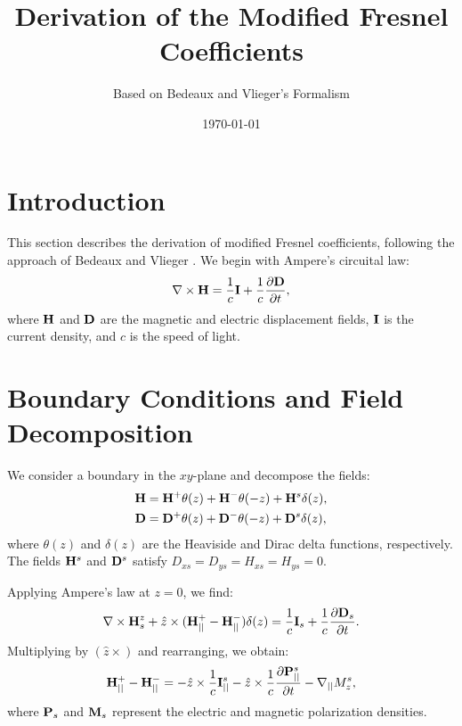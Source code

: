 \documentclass{article}
\begin{document}
	
	\title{Derivation of the Modified Fresnel Coefficients}
	\author{Based on Bedeaux and Vlieger's Formalism}
	\date{\today}
	\maketitle
	
	\section{Introduction}
	This section describes the derivation of modified Fresnel coefficients, following the approach of Bedeaux and Vlieger \cite{bedeaux2001optical}. We begin with Ampere's circuital law:
	\begin{equation}
		\nabla \times \vb{H} = \frac{1}{c} \vb{I} + \frac{1}{c} \frac{\partial \vb{D}}{\partial t},
	\end{equation}
	where $\vb{H}$ and $\vb{D}$ are the magnetic and electric displacement fields, $\vb{I}$ is the current density, and $c$ is the speed of light.
	
	\section{Boundary Conditions and Field Decomposition}
	We consider a boundary in the $xy$-plane and decompose the fields:
	\begin{align}
		\vb{H} &= \vb{H}^{+} \theta(z) + \vb{H}^{-} \theta(-z) + \vb{H}^{s} \delta(z), \\
		\vb{D} &= \vb{D}^{+} \theta(z) + \vb{D}^{-} \theta(-z) + \vb{D}^{s} \delta(z),
	\end{align}
	where $\theta(z)$ and $\delta(z)$ are the Heaviside and Dirac delta functions, respectively. The fields $\vb{H}^s$ and $\vb{D}^s$ satisfy $D_{xs} = D_{ys} = H_{xs} = H_{ys} = 0$.
	
	Applying Ampere’s law at $z=0$, we find:
	\begin{equation}
		\nabla \times \vb{H}_s^z + \hat{z} \times (\vb{H}_{||}^{+} - \vb{H}_{||}^{-}) \delta(z) = \frac{1}{c} \vb{I}_s + \frac{1}{c} \frac{\partial \vb{D}_s}{\partial t}.
	\end{equation}
	Multiplying by $(\hat{z} \times)$ and rearranging, we obtain:
	\begin{equation}
		\vb{H}_{||}^{+} - \vb{H}_{||}^{-} = -\hat{z} \times \frac{1}{c} \vb{I}_{||}^s - \hat{z} \times \frac{1}{c} \frac{\partial \vb{P}_{||}^s}{\partial t} - \nabla_{||} M_{z}^s,
	\end{equation}
	where $\vb{P}_s$ and $\vb{M}_s$ represent the electric and magnetic polarization densities.
	
\end{document}
